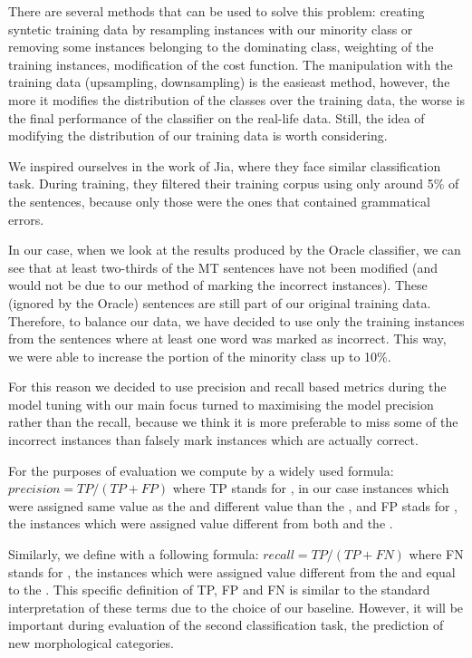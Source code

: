 There are several methods that can be used to solve this problem: creating syntetic
training data by resampling instances with our minority class or removing some instances
belonging to the dominating class, weighting of the training instances, modification of the
cost function. The manipulation with the training data (upsampling, downsampling) is the easieast method,
however, the more it modifies the distribution of the classes over the training data, the worse is the final
performance of the classifier on the real-life data. Still, the idea of modifying the distribution
of our training data is worth considering.

We inspired ourselves in the work of Jia\cite{biblio:ZaPoHiddenMarkov2009}, where they face similar
classification task. During training, they filtered their training corpus using only around 5\% of
the sentences, because only those were the ones that contained grammatical errors.

In our case, when we look at the results produced by the Oracle classifier, we can see that at least
two-thirds of the MT sentences have not been modified (and would not be due to our method of marking
the incorrect instances). These  (ignored by the Oracle) sentences are still part of
our original training data. Therefore, to balance our data, we have decided to use only the training
instances from the sentences where at least one word was marked as incorrect. This way, we were
able to increase the portion of the minority class up to 10\%.


For this reason
we decided to use precision and recall based metrics during the model tuning with
our main focus turned to maximising the model precision rather than the recall,
because we think it is more preferable to miss some of the incorrect instances than falsely mark
instances which are actually correct.

For the purposes of evaluation we compute  by a widely used formula:
$precision = TP / (TP + FP)$
where TP stands for , in our case instances which were
assigned same value as the  and different value than the ,
and FP stads for , the instances which were assigned value
different from both  and the .

Similarly, we define  with a following formula:
$recall = TP / (TP + FN)$
where FN stands for , the instances which were assigned value
different from the  and equal to the .
This specific definition of TP, FP and FN is similar to the standard interpretation
of these terms due to the choice of our baseline. However, it will be important
during evaluation of the second classification task, the prediction of new morphological
categories.

